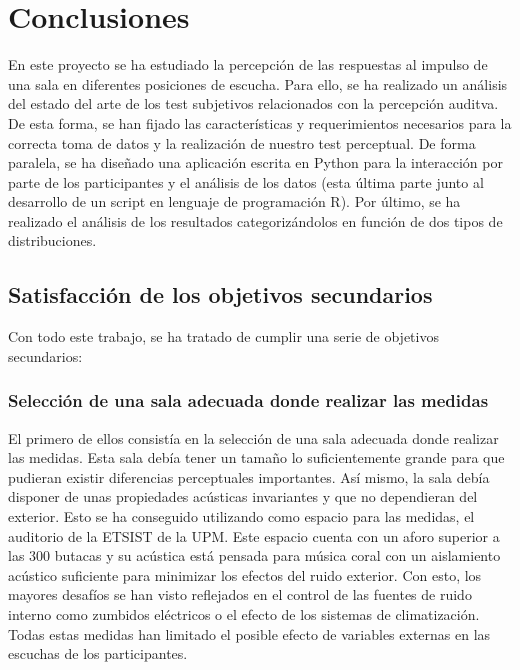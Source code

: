 \documentclass[11pt,a4paper]{book}
\begin{document}
\chapter{Conclusiones}
    En este proyecto se ha estudiado la percepción de las respuestas al impulso de una sala en diferentes posiciones de escucha. Para ello, se ha realizado un análisis del estado del arte de los test subjetivos relacionados con la percepción auditva. De esta forma, se han fijado las características y requerimientos necesarios para la correcta toma de datos y la realización de nuestro test perceptual. De forma paralela, se ha diseñado una aplicación escrita en Python para la interacción por parte de los participantes y el análisis de los datos (esta última parte junto al desarrollo de un script en lenguaje de programación R). Por último, se ha realizado el análisis de los resultados categorizándolos en función de dos tipos de distribuciones.
    
    \section{Satisfacción de los objetivos secundarios}
    
        Con todo este trabajo, se ha tratado de cumplir una serie de objetivos secundarios:
        
        \subsection*{Selección de una sala adecuada donde realizar las medidas}    
            El primero de ellos consistía en la selección de una sala adecuada donde realizar las medidas. Esta sala debía tener un tamaño lo suficientemente grande para que pudieran existir diferencias perceptuales importantes. Así mismo, la sala debía disponer de unas propiedades acústicas invariantes y que no dependieran del exterior. Esto se ha conseguido utilizando como espacio para las medidas, el auditorio de la ETSIST de la UPM. Este espacio cuenta con un aforo superior a las 300 butacas y su acústica está pensada para música coral con un aislamiento acústico suficiente para minimizar los efectos del ruido exterior. Con esto, los mayores desafíos se han visto reflejados en el control de las fuentes de ruido interno como zumbidos eléctricos o el efecto de los sistemas de climatización. Todas estas medidas han limitado el posible efecto de variables externas en las escuchas de los participantes.
        
\end{document}
